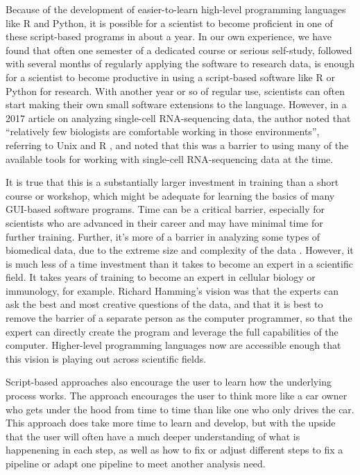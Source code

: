 \documentclass[]{tufte-book}
\begin{document}
Because of the development of easier-to-learn high-level programming languages
like R and Python, it is possible for a scientist to become proficient in one of
these script-based programs in about a year. In our own experience, we have
found that often one semester of a dedicated course or serious self-study,
followed with several months of regularly applying the software to research
data, is enough for a scientist to become productive in using a script-based
software like R or Python for research. With another year or so of regular use,
scientists can often start making their own small software extensions to the
language. However, in a 2017 article on analyzing single-cell RNA-sequencing
data, the author noted that ``relatively few biologists are comfortable working
in those environments'', referring to Unix and R \citep{perkel2017single}, and noted
that this was a barrier to using many of the available tools for working with
single-cell RNA-sequencing data at the time.

It is true that this is a substantially larger investment in training than a
short course or workshop, which might be adequate for learning the basics of
many GUI-based software programs. Time can be a critical barrier, especially for
scientists who are advanced in their career and may have minimal time for
further training. Further, it's more of a barrier in analyzing some types of
biomedical data, due to the extreme size and complexity of the data
\citep{nekrutenko2012next}. However, it is much less of a time investment than it
takes to become an expert in a scientific field. It takes years of training to
become an expert in cellular biology or immunology, for example. Richard
Hamming's vision was that the experts can ask the best and most creative
questions of the data, and that it is best to remove the barrier of a separate
person as the computer programmer, so that the expert can directly create the
program and leverage the full capabilities of the computer. Higher-level
programming languages now are accessible enough that this vision is playing out
across scientific fields.

Script-based approaches also encourage the user to learn how the underlying process
works. The approach encourages the user to think more like a car owner who gets
under the hood from time to time than like one who only drives the car. This
approach does take more time to learn and develop, but with the upside that the
user will often have a much deeper understanding of what is happenening in each
step, as well as how to fix or adjust different steps to fix a pipeline or
adapt one pipeline to meet another analysis need.
\end{document}

